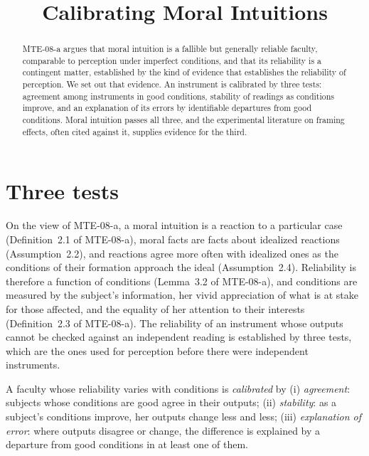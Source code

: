 \documentclass{situationist-preprint}
\title{Calibrating Moral Intuitions}
\begin{document}
\maketitle

\begin{abstract}
MTE-08-a argues that moral intuition is a fallible but generally reliable faculty, comparable to perception under imperfect conditions, and that its reliability is a contingent matter, established by the kind of evidence that establishes the reliability of perception. We set out that evidence. An instrument is calibrated by three tests: agreement among instruments in good conditions, stability of readings as conditions improve, and an explanation of its errors by identifiable departures from good conditions. Moral intuition passes all three, and the experimental literature on framing effects, often cited against it, supplies evidence for the third.
\end{abstract}

\section{Three tests}\label{s:tests}

On the view of MTE-08-a, a moral intuition is a reaction to a particular case (Definition~2.1 of MTE-08-a), moral facts are facts about idealized reactions (Assumption~2.2), and reactions agree more often with idealized ones as the conditions of their formation approach the ideal (Assumption~2.4). Reliability is therefore a function of conditions (Lemma~3.2 of MTE-08-a), and conditions are measured by the subject's information, her vivid appreciation of what is at stake for those affected, and the equality of her attention to their interests (Definition~2.3 of MTE-08-a). The reliability of an instrument whose outputs cannot be checked against an independent reading is established by three tests, which are the ones used for perception before there were independent instruments.

\begin{definition}\label{d:cal}
A faculty whose reliability varies with conditions is \emph{calibrated} by (i) \emph{agreement}: subjects whose conditions are good agree in their outputs; (ii) \emph{stability}: as a subject's conditions improve, her outputs change less and less; (iii) \emph{explanation of error}: where outputs disagree or change, the difference is explained by a departure from good conditions in at least one of them.
\end{definition}
\end{document}
